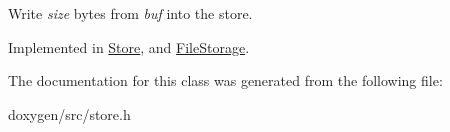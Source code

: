 Write {\itshape size} bytes from {\itshape buf} into the store. 

Implemented in \mbox{\hyperlink{class_store_aec754c74cf190cb55281a923db21194a}{Store}}, and \mbox{\hyperlink{class_file_storage_a9f680051229bda7bca2639e5464bca77}{File\+Storage}}.



The documentation for this class was generated from the following file\+:\begin{DoxyCompactItemize}
\item 
doxygen/src/store.\+h\end{DoxyCompactItemize}
